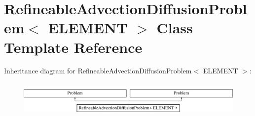 \hypertarget{classRefineableAdvectionDiffusionProblem}{}\section{Refineable\+Advection\+Diffusion\+Problem$<$ E\+L\+E\+M\+E\+NT $>$ Class Template Reference}
\label{classRefineableAdvectionDiffusionProblem}
Inheritance diagram for Refineable\+Advection\+Diffusion\+Problem$<$ E\+L\+E\+M\+E\+NT $>$\+:\begin{figure}[H]
\begin{center}
\leavevmode
\includegraphics[height=1.777778cm]{classRefineableAdvectionDiffusionProblem}
\end{center}
\end{figure}
